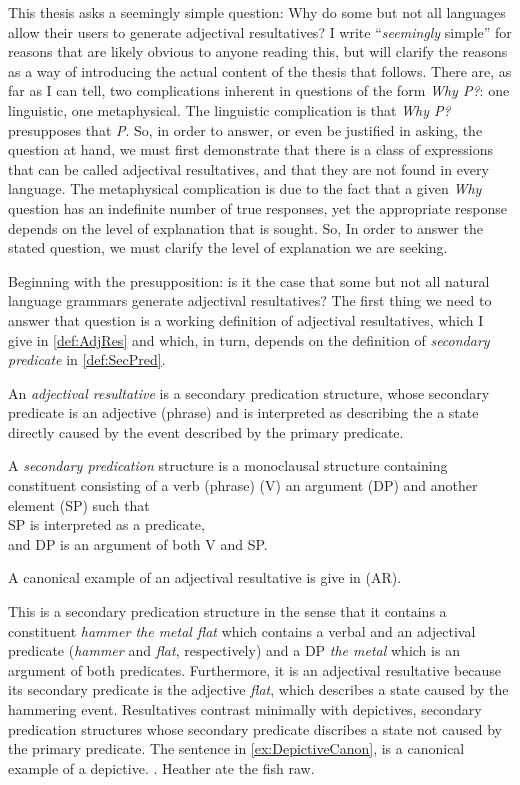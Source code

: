 \documentclass[MilwayThesis]{subfiles}
\begin{document}
This thesis asks a seemingly simple question: Why do some but not all languages allow their users to generate adjectival resultatives?
I write ``\textit{seemingly} simple'' for reasons that are likely obvious to anyone reading this, but will clarify the reasons as a way of introducing the actual content of the thesis that follows.
There are, as far as I can tell, two complications inherent in questions of the form \textit{Why P?}: one linguistic, one metaphysical.
The linguistic complication is that \textit{Why P?} presupposes that \textit{P}.
So, in order to answer, or even be justified in asking, the question at hand, we must first demonstrate that there is a class of expressions that can be called adjectival resultatives, and that they are not found in every language.
The metaphysical complication is due to the fact that a given \textit{Why} question has an indefinite number of true responses, yet the appropriate response depends on the level of explanation that is sought.
So, In order to answer the stated question, we must clarify the level of explanation we are seeking.

Beginning with the presupposition: is it the case that some but not all natural language grammars generate adjectival resultatives?
The first thing we need to answer that question is a working definition of adjectival resultatives, which I give in \cref{def:AdjRes} and which, in turn, depends on the definition of \textit{secondary predicate} in \cref{def:SecPred}.
\begin{defn}\label{def:AdjRes}
	An \textit{adjectival resultative} is a secondary predication structure, whose secondary predicate is an adjective (phrase) and is interpreted as describing the a state directly caused by the event described by the primary predicate.
\end{defn}
\begin{defn}\label{def:SecPred}
	A \textit{secondary predication} structure is a monoclausal structure containing constituent consisting of a verb (phrase) (V) an argument (DP) and another element (SP) such that\\
	SP is interpreted as a predicate,\\
	and DP is an argument of both V and SP.
\end{defn}

A canonical example of an adjectival resultative is give in (AR).
\AREx

This is a secondary predication structure in the sense that it contains a constituent \textit{hammer the metal flat} which contains a verbal and an adjectival predicate (\textit{hammer} and \textit{flat}, respectively) and a DP \textit{the metal} which is an argument of both predicates.
Furthermore, it is an adjectival resultative because its secondary predicate is the adjective \textit{flat}, which describes a state caused by the hammering event.
Resultatives contrast minimally with depictives, secondary predication structures whose secondary predicate discribes a state not caused by the primary predicate.
The sentence in \cref{ex:DepictiveCanon}, is a canonical example of a depictive.
\ex.\label{ex:DepictiveCanon} Heather ate the fish raw.
\end{document}
